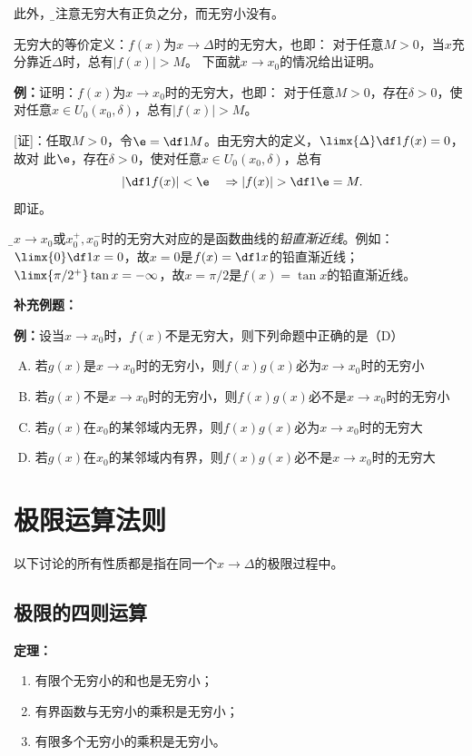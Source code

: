 此外，{\b 要注意无穷大有正负之分，而无穷小没有。}

无穷大的等价定义：$f(x)$为$x\to\Delta$时的无穷大，也即：
对于任意$M>0$，当$x$充分靠近$\Delta$时，总有$|f(x)|>M$。
下面就$x\to x_0$的情况给出证明。

{\bf 例：}证明：$f(x)$为$x\to x_0$时的无穷大，也即：
对于任意$M>0$，存在$\delta>0$，使对任意$x\in U_0(x_0,\delta)$，总有$|f(x)|>M$。

[证]：任取$M>0$，令$\e=\df1M$。由无穷大的定义，$\limx{\Delta}\df1{f(x)}=0$，故对
此$\e$，存在$\delta>0$，使对任意$x\in U_0(x_0,\delta)$，总有
$$\left|\df1{f(x)}\right|<\e\quad\Rightarrow |f(x)|>\df1{\e}=M.$$
即证。

{\b$x\to x_0$或$x_0^+,x_0^-$时的无穷大对应的是函数曲线的{\it 铅直渐近线}}。例如：
$\limx{0}\df1x=0$，故$x=0$是$f(x)=\df1x$的铅直渐近线；
$\limx{\pi/2^+}\tan x=-\infty$，故$x=\pi/2$是$f(x)=\tan x$的铅直渐近线。

{\bf 补充例题：}

{\bf 例：}设当$x\to
x_0$时，$f(x)$不是无穷大，则下列命题中正确的是（D）
\begin{enumerate}[(A)]
  \setlength{\itemindent}{1cm}
  \item 若$g(x)$是$x\to x_0$时的无穷小，则$f(x)g(x)$必为$x\to x_0$时的无穷小
  \item 若$g(x)$不是$x\to x_0$时的无穷小，则$f(x)g(x)$必不是$x\to x_0$时的无穷小
  \item 若$g(x)$在$x_0$的某邻域内无界，则$f(x)g(x)$必为$x\to x_0$时的无穷大
  \item 若$g(x)$在$x_0$的某邻域内有界，则$f(x)g(x)$必不是$x\to x_0$时的无穷大
\end{enumerate}

\section{极限运算法则}

以下讨论的所有性质都是指在同一个$x\to\Delta$的极限过程中。

\subsection{极限的四则运算}

{\bf 定理：}
\begin{enumerate}[(1)]
  \setlength{\itemindent}{1cm}
  \item 有限个无穷小的和也是无穷小；
  \item 有界函数与无穷小的乘积是无穷小；
  \item 有限多个无穷小的乘积是无穷小。
\end{enumerate}

